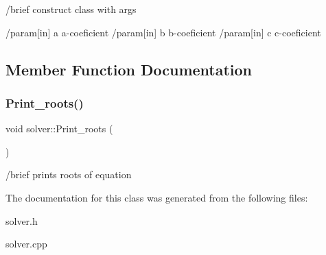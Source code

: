 /brief construct class with args

/param\mbox{[}in\mbox{]} a a-\/coeficient /param\mbox{[}in\mbox{]} b b-\/coeficient /param\mbox{[}in\mbox{]} c c-\/coeficient 

\subsection{Member Function Documentation}
\mbox{\label{classsolver_a8a6dab24178576aab71e67bf5b95bf0f}} 
\subsubsection{\texorpdfstring{Print\+\_\+roots()}{Print\_roots()}}
{\footnotesize\ttfamily void solver\+::\+Print\+\_\+roots (\begin{DoxyParamCaption}{ }\end{DoxyParamCaption})}

/brief prints roots of equation 

The documentation for this class was generated from the following files\+:\begin{DoxyCompactItemize}
\item 
solver.\+h\item 
solver.\+cpp\end{DoxyCompactItemize}
